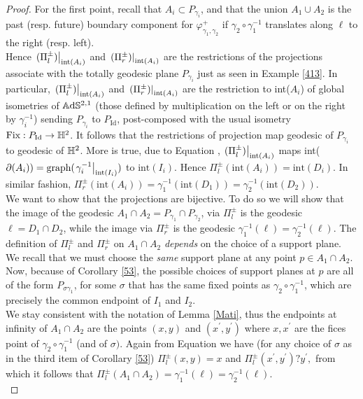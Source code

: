 \begin{proof}
    For the first point, recall that $A_i\subset P_{\gamma_i}$, and that the union $A_1\cup A_2$ is the past (resp. future) boundary component for $\varphi_{\gamma_1,\gamma_2}^+$ if $\gamma_2\circ\gamma_1^{-1}$ translates along $\ell$ to the right (resp. left). \\
    Hence $\left.(\Pi_l^\pm)\right|_{\text{int}(A_i)}$ and $\left.(\Pi_r^\pm)\right|_{\text{int}(A_i)}$ are the restrictions of the projections associate with the totally geodesic plane $P_{\gamma_i}$ just as seen in Example \ref{413}. In particular, $\left.(\Pi_l^\pm)\right|_{\text{int}(A_i)}$ and $\left.(\Pi_r^\pm)\right|_{\text{int}(A_i)}$ are the restriction to int($A_i$) of global isometries of $\mathbb{A}\mathrm{d}\mathbb{S}^{2,1}$ (those defined by multiplication on the left or on the right by $\gamma_i^{-1}$) sending $P_{\gamma_i}$ to $P_{\text{Id}}$, post-composed with the usual isometry $\text{Fix}:P_{\text{Id}}\to\mathbb{H}^2$. It follows that the restrictions of projection map geodesic of $P_{\gamma_i}$ to geodesic of $\mathbb{H}^2$. More is true, due to Equation , $\left.(\Pi_l^\pm)\right|_{\text{int}(A_i)}$ maps int($\partial(A_i))=\text{graph(\ensuremath{\left.\gamma_i^{-1}\right|_{\text{int}(I_i)}})}$ to $\text{int}(I_i).$ Hence $\Pi_l^\pm(\text{int}(A_i))=\text{int}(D_i)$. In similar fashion, $\Pi_r^\pm(\text{int}(A_i))=\gamma_1^{-1}(\text{int}(D_1))=\gamma_2^{-1}(\text{int}(D_2)).$\\
 We want to show that the projections are bijective. To do so we will show that the image of the geodesic $A_1\cap A_2=P_{\gamma_1}\cap P_{\gamma_2}$, via $\Pi_l^\pm$ is the geodesic $\ell=D_{1}\cap D_2$, while the image via $\Pi_r^\pm$ is the geodesic $\gamma_1^{-1}(\ell)=\gamma_2^{-1}(\ell).$ The definition of $\Pi_l^\pm$ and $\Pi_r^\pm$ on $A_1\cap A_2$ \textit{depends} on the choice of a support plane. We recall that we must choose the \textit{same} support plane at any point $p\in A_1\cap A_2$. Now, because of Corollary \ref{53}, the possible choices of support planes at $p$ are all of the form $P_{\sigma\gamma_1}$, for some $\sigma$ that has the same fixed points as $\gamma_2\circ\gamma_1^{-1}$, which are precisely the common endpoint of $I_1$ and $I_2$. \\
 We stay consistent with the notation of Lemma \ref{Mati}, thus the endpoints at infinity of $A_1\cap A_2$ are the points $(x,y)$ and $(x^{\prime},y^{\prime})$ where $x,x^{\prime} $ are the fices point of $\gamma_2\circ\gamma_1^{-1}$ (and of $\sigma)$. Again from Equation  we have (for any choice of $\sigma$ as in the third item of Corollary \ref{53}) $\Pi_l^\pm(x,y)=x$ and $\Pi_l^\pm(x^{\prime} ,y^{\prime} )?y^{\prime},$ from which it follows that $\Pi_l^\pm(A_1\cap A_2)=\gamma_1^{-1}(\ell)=\gamma_2^{-1}(\ell).$ \\

\end{proof}
